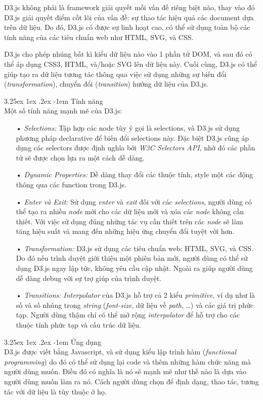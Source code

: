 \documentclass[12pt,a4paper,twoside]{article}
\makeatletter
\newcommand{\myparagraph}[1]{\paragraph{#1}\mbox{}\\} %
\renewcommand\paragraph{\@startsection{paragraph}{5}{\z@}%
  {3.25ex \@plus1ex \@minus.2ex}%
  {-1em}%
  {\normalfont\normalsize\bfseries}}
\makeatother
\begin{document}
D3.js không phải là framework giải quyết mỗi vấn đề riêng biệt nào, thay vào đó D3.js giải quyết điểm cốt lõi của vấn đề: sự thao tác hiệu quả các document dựa trên dữ liệu. Do đó, D3.js có được sự linh hoạt cao, có thể sử dụng toàn bộ các tính năng của các tiêu chuẩn web như HTML, SVG, và CSS.

D3.js cho phép nhúng bất kì kiểu dữ liệu nào vào 1 phần tử DOM, và sau đó có thể áp dụng CSS3, HTML, và/hoặc SVG lên dữ liệu này. Cuối cùng, D3.js có thể giúp tạo ra dữ liệu tương tác thông qua việc sử dụng những sự biến đổi (\textit{transformation}), chuyển đổi (\textit{transition}) hướng dữ liệu của D3.js.

\myparagraph{Tính năng}
Một số tính năng mạnh mẽ của D3.js:
\begin{itemize}
\item[•] \emph{Selections:} Tập hợp các node tùy ý gọi là selections, và D3.js sử dụng phương pháp declarative để biến đổi selections này. Đặc biệt D3.js cũng áp dụng các selectors được định nghĩa bởi \textit{W3C Selectors API}, nhờ đó các phần tử sẽ được chọn lựa ra một cách dễ dàng.
\item[•] \emph{Dynamic Properties:} Dễ dàng thay đổi các thuộc tính, style một các động thông qua các function trong D3.js.
\item[•] \emph{Enter và Exit:} Sử dụng \textit{enter} và \textit{exit} đối với các \textit{selections}, người dùng có thể tạo ra nhiều \textit{node} mới cho các dữ liệu mới và xóa các \textit{node} không cần thiết. Với việc sử dụng đúng những tác vụ cần thiết trên các \textit{node} sẽ làm tăng hiệu suất và mang đến những hiệu ứng chuyển đổi tuyệt vời hơn.
\item[•] \emph{Transformation:} D3.js sử dụng các tiêu chuẩn web: HTML, SVG, và CSS. Do đó nếu trình duyệt giới thiệu một phiên bản mới, người dùng có thể sử dụng D3.js ngay lập tức, không yêu cầu cập nhật. Ngoài ra giúp người dùng dễ dàng debug với sự trợ giúp của trình duyệt.
\item[•] \emph{Transitions:} \textit{Interpolator} của D3.js hỗ trợ cả 2 kiểu \textit{primitive}, ví dụ như là số và số nhúng trong \textit{string} (\textit{font-size}, dữ liệu về \textit{path}, …) và các giá trị phức tạp. Người dùng thậm chí có thể mở rộng \textit{interpolator} để hỗ trợ cho các thuộc tính phức tạp và cấu trúc dữ liệu.
\end{itemize}

\myparagraph{Ứng dụng}
D3.js được viết bằng Javascript, và sử dụng kiểu lập trình hàm (\textit{functional programming}) do đó có thể sử dụng lại code và thêm những hàm chức năng mà người dùng muốn. Điều đó có nghĩa là nó sẽ mạnh mẽ như thế nào là dựa vào người dùng muốn làm ra nó. Cách người dùng chọn để định dạng, thao tác, tương tác với dữ liệu là tùy thuộc ở họ.
\end{document}
